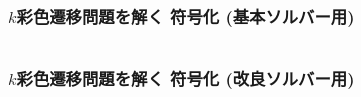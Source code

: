 \begin{frame}[shrink]
  \frametitle{$k$彩色遷移問題を解く 符号化 {\small(基本ソルバー用)}}

\begin{columns}[t]
\begin{column}{0.95\linewidth}
\begin{exampleblock}{}
 
\end{exampleblock}    
\end{column}
\end{columns}


\end{frame}
\begin{frame}[shrink]
  \frametitle{$k$彩色遷移問題を解く 符号化 {\small(改良ソルバー用)}}

\begin{columns}[t]
\begin{column}{0.9\linewidth}
\begin{exampleblock}{}
 
\end{exampleblock}    
\end{column}
\end{columns}
\end{frame}
